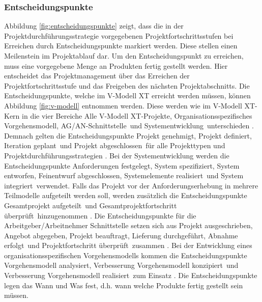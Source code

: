  \subsubsection{Entscheidungspunkte}
Abbildung \ref{fig:entscheidungspunkte} zeigt, dass die in der Projektdurchführungsstrategie vorgegebenen Projektfortschrittsstufen bei Erreichen durch Entscheidungspunkte markiert werden. Diese stellen einen Meilenstein im Projektablauf dar. Um den Entscheidungspunkt zu erreichen, muss eine vorgegebene Menge an Produkten fertig gestellt werden. Hier entscheidet das Projektmanagement über das Erreichen der Projektfortschrittsstufe und das Freigeben des nächsten Projektabschnitts. Die Entscheidungspunkte, welche im V-Modell XT erreicht werden müssen, können Abbildung \ref{fig:v-modell} entnommen werden. Diese werden wie im V-Modell XT-Kern in die vier Bereiche \grqq Alle V-Modell XT-Projekte\grqq, \grqq Organisationsspezifisches Vorgehensmodell\grqq, \grqq AG/AN-Schnittstelle\grqq \ und \grqq Systementwicklung\grqq \ unterschieden \cite{2004vmodell}. \newline
Demnach gelten die Entscheidungspunkte \grqq Projekt genehmigt\grqq, \grqq Projekt definiert, \grqq Iteration geplant\grqq \ und \grqq Projekt abgeschlossen\grqq \ für alle Projekttypen und Projektdurchführungsstrategien \cite{2004vmodell}. \newline
Bei der Systementwicklung werden die Entscheidungspunkte \grqq Anforderungen festgelegt\grqq, \grqq System spezifiziert\grqq, \grqq System entworfen\grqq, \grqq Feinentwurf abgeschlossen\grqq, \grqq Systemelemente realisiert\grqq \ und \grqq System integriert\grqq \ verwendet. Falls das Projekt vor der Anforderungserhebung in mehrere Teilmodelle aufgeteilt werden soll, werden zusätzlich die Entscheidungspunkte \grqq Gesamtprojekt aufgeteilt\grqq \ und \grqq Gesamtprojektfortschritt überprüft\grqq \ hinzugenommen \cite{2004vmodell}. \newline
Die Entscheidungspunkte für die Arbeitgeber/Arbeitnehmer Schnittstelle setzen sich aus \grqq Projekt ausgeschrieben\grqq, \grqq Angebot abgegeben\grqq, \grqq Projekt beauftragt\grqq, \grqq Lieferung durchgeführt\grqq, \grqq Abnahme erfolgt\grqq \ und \grqq Projektfortschritt überprüft\grqq \ zusammen \cite{2004vmodell}. \newline
 Bei der Entwicklung eines organisationsspezifischen Vorgehensmodells kommen die Entscheidungspunkte \grqq Vorgehensmodell analysiert\grqq, \grqq Verbesserung Vorgehensmodell konzipiert\grqq \ und \grqq Verbesserung Vorgehensmodell realisiert\grqq \ zum Einsatz \cite{2004vmodell}. \newline
 Die Entscheidungspunkte legen das \grqq Wann\grqq {} und \grqq Was\grqq {} fest, d.h. wann welche Produkte fertig gestellt sein müssen.

